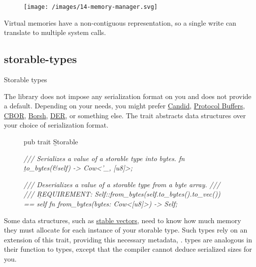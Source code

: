 \documentclass{article}
\begin{document}
\begin{figure}[grayscale-diagram]
\label{memory-manager}
\texttt{[image: /images/14-memory-manager.svg]}
\end{figure}

Virtual memories have a non-contiguous representation, so a single write can translate to multiple system calls.

\subsection{storable-types}{Storable types}

The library does not impose any serialization format on you and does not provide a default.
Depending on your needs, you might prefer \href{https://github.com/dfinity/candid}{Candid}, \href{https://developers.google.com/protocol-buffers}{Protocol Buffers}, \href{https://cbor.io/}{CBOR}, \href{https://borsh.io/}{Borsh}, \href{https://en.wikipedia.org/wiki/X.690#DER_encoding}{DER}, or something else.
The  trait abstracts data structures over your choice of serialization format.

\begin{figure}
\begin{code}[rust]
pub trait \b{Storable} {\label{storable-trait}
    \em{/// Serializes a value of a storable type into bytes.}
    fn \b{to_bytes}(&self) -> Cow<'_, [u8]>;

    \em{/// Deserializes a value of a storable type from a byte array.}
    \em{///}
    \em{/// \b{REQUIREMENT}: Self::from_bytes(self.to_bytes().to_vec()) == self}
    fn \b{from_bytes}(bytes: Cow<[u8]>) -> Self;
}
\end{code}
\end{figure}

Some data structures, such as \href{stable-vector}{stable vectors}, need to know how much memory they must allocate for each instance of your storable type.
Such types rely on an extension of this trait, providing this necessary metadata, .
 types are analogous in their function to \href{https://doc.rust-lang.org/std/marker/trait.Sized.html}{} types, except that the compiler cannot deduce serialized sizes for you.
\end{document}
